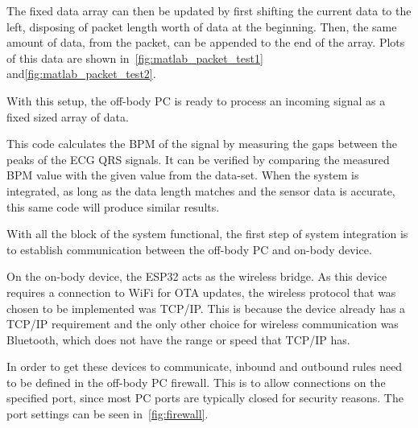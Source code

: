 The fixed data array can then be updated by first shifting the current data to the left, disposing of packet length worth of data at the beginning.
Then, the same amount of data, from the packet, can be appended to the end of the array.
Plots of this data are shown in~\autoref{fig:matlab_packet_test1} and\autoref{fig:matlab_packet_test2}.

With this setup, the off-body PC is ready to process an incoming signal as a fixed sized array of data.

This code calculates the BPM of the signal by measuring the gaps between the peaks of the ECG QRS signals.
It can be verified by comparing the measured BPM value with the given value from the data-set.
When the system is integrated, as long as the data length matches and the sensor data is accurate,
this same code will produce similar results.

With all the block of the system functional,
the first step of system integration is to establish communication between the off-body PC and on-body device.

On the on-body device, the ESP32 acts as the wireless bridge.
As this device requires a connection to WiFi for OTA updates, the wireless protocol that was chosen to be implemented was TCP/IP.
This is because the device already has a TCP/IP requirement and the only other choice for wireless communication was Bluetooth, which does not have the range or speed that TCP/IP has.

In order to get these devices to communicate, inbound and outbound rules need to be defined in the off-body PC firewall.
This is to allow connections on the specified port, since most PC ports are typically closed for security reasons.
The port settings can be seen in~\autoref{fig:firewall}.

